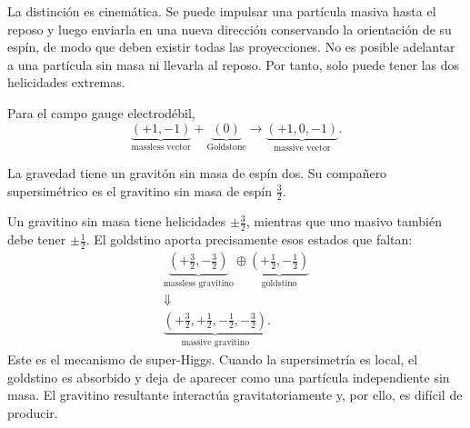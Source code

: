 La distinción es cinemática. Se puede impulsar una partícula masiva hasta el reposo y luego enviarla en una nueva dirección conservando la orientación de su espín, de modo que deben existir todas las proyecciones. No es posible adelantar a una partícula sin masa ni llevarla al reposo. Por tanto, solo puede tener las dos helicidades extremas.

Para el campo gauge electrodébil,
\begin{equation}
\underbrace{(+1,-1)}_{\text{massless vector}}
+
\underbrace{(0)}_{\text{Goldstone}}
\longrightarrow
\underbrace{(+1,0,-1)}_{\text{massive vector}}.
\label{eq:l9-higgs-count}
\end{equation}

\begin{classroomqa}
\end{classroomqa}

La gravedad tiene un gravitón sin masa de espín dos. Su compañero supersimétrico es el gravitino sin masa de espín \(\tfrac32\).

\begin{classroomqa}
\end{classroomqa}

Un gravitino sin masa tiene helicidades \(\pm\tfrac32\), mientras que uno masivo también debe tener \(\pm\tfrac12\). El goldstino aporta precisamente esos estados que faltan:
\begin{equation}
\begin{gathered}
\underbrace{\left(+\frac32,-\frac32\right)}_{\text{massless gravitino}}
\oplus
\underbrace{\left(+\frac12,-\frac12\right)}_{\text{goldstino}}\\
\Downarrow\\
\underbrace{\left(+\frac32,+\frac12,-\frac12,-\frac32\right)}_{\text{massive gravitino}}.
\end{gathered}
\label{eq:l9-super-higgs}
\end{equation}
Este es el mecanismo de super-Higgs. Cuando la supersimetría es local, el goldstino es absorbido y deja de aparecer como una partícula independiente sin masa. El gravitino resultante interactúa gravitatoriamente y, por ello, es difícil de producir.

